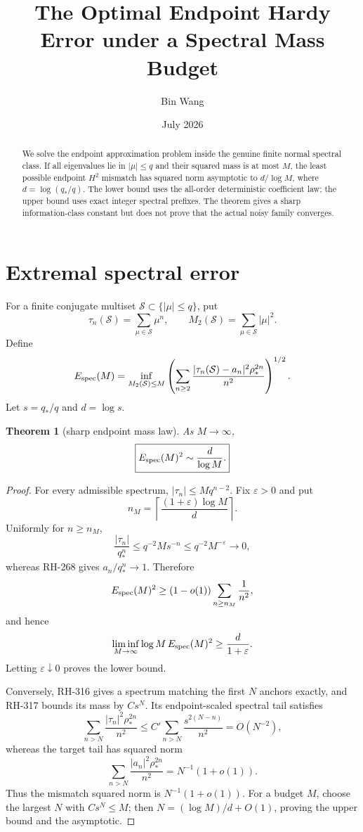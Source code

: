 \documentclass[11pt]{article}
\title{The Optimal Endpoint Hardy Error under a Spectral Mass Budget}
\author{Bin Wang}\date{July 2026}
\newtheorem{theorem}{Theorem}[section]
\theoremstyle{remark}\newtheorem{remark}[theorem]{Remark}
\begin{document}
\maketitle
\begin{abstract}
We solve the endpoint approximation problem inside the genuine finite normal
spectral class.  If all eigenvalues lie in $|\mu|\le q$ and their squared
mass is at most $M$, the least possible endpoint $H^2$ mismatch has squared
norm asymptotic to $d/\log M$, where $d=\log(q_*/q)$.  The lower bound uses
the all-order deterministic coefficient law; the upper bound uses exact
integer spectral prefixes.  The theorem gives a sharp information-class
constant but does not prove that the actual noisy family converges.
\end{abstract}

\section{Extremal spectral error}
For a finite conjugate multiset $\mathcal S\subset\{|\mu|\le q\}$, put
\[
 \tau_n(\mathcal S)=\sum_{\mu\in\mathcal S}\mu^n,
 \qquad M_2(\mathcal S)=\sum_{\mu\in\mathcal S}|\mu|^2.
\]
Define
\[
 E_{\rm spec}(M)=\inf_{M_2(\mathcal S)\le M}
 \left(\sum_{n\ge2}
 \frac{|\tau_n(\mathcal S)-a_n|^2\rho_*^{2n}}{n^2}
 \right)^{1/2}.
\]
Let $s=q_*/q$ and $d=\log s$.

\begin{theorem}[sharp endpoint mass law]
As $M\to\infty$,
\[
 \boxed{E_{\rm spec}(M)^2\sim\frac{d}{\log M}.}
\]
\end{theorem}
\begin{proof}
For every admissible spectrum, $|\tau_n|\le Mq^{n-2}$.  Fix
$\varepsilon>0$ and put
\[
 n_M=\left\lceil\frac{(1+\varepsilon)\log M}{d}\right\rceil.
\]
Uniformly for $n\ge n_M$,
\[
 \frac{|\tau_n|}{q_*^n}
 \le q^{-2}Ms^{-n}\le q^{-2}M^{-\varepsilon}\longrightarrow0,
\]
whereas RH-268 gives $a_n/q_*^n\to1$.  Therefore
\[
 E_{\rm spec}(M)^2
 \ge(1-o(1))\sum_{n\ge n_M}\frac1{n^2},
\]
and hence
\[
 \liminf_{M\to\infty}\log M\,E_{\rm spec}(M)^2
 \ge\frac d{1+\varepsilon}.
\]
Letting $\varepsilon\downarrow0$ proves the lower bound.

Conversely, RH-316 gives a spectrum matching the first $N$ anchors exactly,
and RH-317 bounds its mass by $Cs^N$.  Its endpoint-scaled spectral tail
satisfies
\[
 \sum_{n>N}\frac{|\tau_n|^2\rho_*^{2n}}{n^2}
 \le C'\sum_{n>N}\frac{s^{2(N-n)}}{n^2}=O(N^{-2}),
\]
whereas the target tail has squared norm
\[
 \sum_{n>N}\frac{|a_n|^2\rho_*^{2n}}{n^2}
 =N^{-1}(1+o(1)).
\]
Thus the mismatch squared norm is $N^{-1}(1+o(1))$.  For a budget $M$,
choose the largest $N$ with $Cs^N\le M$; then
$N=(\log M)/d+O(1)$, proving the upper bound and the asymptotic.
\end{proof}
\end{document}
